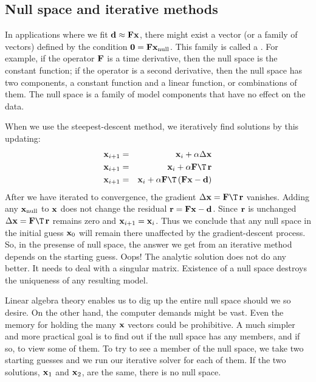 \subsection{Null space and iterative methods}
In applications where we fit
$\bold d \approx\bold F \bold x$,
there might exist a vector (or a family of vectors)
defined by the condition $\bold 0 =\bold F \bold x_{\rm null}$.
This family is called a .
For example, if the operator $\bold F$ is a time derivative,
then the null space is the constant function;
if the operator is a second derivative,
then the null space has two components, a constant function
and a linear function, or combinations of them.
The null space is a family of model components that have no effect on the data.
\par
When we use the steepest-descent method,
we iteratively find solutions by this updating:
\begin{eqnarray}
\bold x_{i+1} &=& \bold x_i + \alpha \Delta \bold x                     \\
\bold x_{i+1} &=& \bold x_i + \alpha \bold F\T\,\bold r                   \\
\bold x_{i+1} &=& \bold x_i + \alpha \bold F\T\,(\bold F\bold x -\bold d)
\end{eqnarray}
After we have iterated to convergence,
the gradient
$ \Delta \bold x=\bold F\T\, \bold r$
vanishes.
Adding any $\bold x_{\rm null}$ to $\bold x$
does not change the residual
$\bold r=\bold F\bold x -\bold d$.
Since $\bold r$ is unchanged
$ \Delta \bold x=\bold F\T\, \bold r$
remains zero and $\bold x_{i+1} =\bold x_i$.
Thus we conclude that any null space in the initial guess $\bold x_0$
will remain there unaffected by the gradient-descent process.
So, in the presense of null space,
the answer we get from an iterative method
depends on the starting guess.
Oops!
The analytic solution does not do any better.
It needs to deal with a singular matrix.
Existence of a null space destroys the uniqueness of any resulting model.
\par
Linear algebra theory enables us to dig up the entire null space
should we so desire.
On the other hand, the computer demands might be vast.
Even the memory for holding the many $\bold x$ vectors could be prohibitive.
A much simpler and more practical goal
is to find out if the null space has any members,
and if so, to view some of them.
To try to see a member of the null space,
we take two starting guesses
and we run our iterative solver for each of them.
If the two solutions,
$\bold x_1$ and $\bold x_2$,
are the same, there is no null space.
